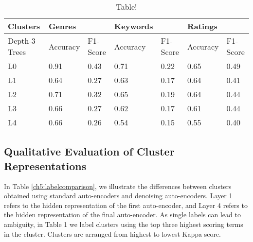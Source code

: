 \begin{table}[]
	\centering
	\begin{tabular}{lllllll}
		\textbf{Clusters}      & \textbf{Genres}   &          & \textbf{Keywords} &          & \textbf{Ratings}  &          \\
		\toprule
		Depth-3 Trees & Accuracy & F1-Score & Accuracy & F1-Score & Accuracy & F1-Score \\
		L0            & 0.91     & 0.43     & 0.71     & 0.22     & 0.65     & 0.49     \\
		L1            & 0.64     & 0.27     & 0.63     & 0.17     & 0.64     & 0.41     \\
		L2            & 0.71     & 0.32     & 0.65     & 0.19     & 0.64     & 0.44     \\
		L3            & 0.66     & 0.27     & 0.62     & 0.17     & 0.61     & 0.44     \\
		L4            & 0.66     & 0.26     & 0.54     & 0.15     & 0.55     & 0.40    
	\end{tabular}
\caption{Table!}\label{quanautoresult}
\end{table}







\subsection{Qualitative Evaluation of Cluster Representations}\label{auto-encoder-qual}


 In Table \ref{ch5:labelcomparison}, we illustrate the differences between clusters obtained using standard auto-encoders and denoising auto-encoders. Layer 1 refers to the hidden representation of the first auto-encoder, and Layer 4 refers to the hidden representation of the final auto-encoder. As single labels can lead to ambiguity, in Table 1 we label clusters using the top three highest scoring terms in the cluster. Clusters are arranged from highest to lowest Kappa score. 

